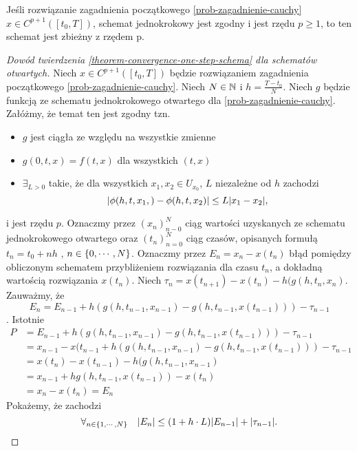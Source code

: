 \documentclass[12pt,a4paper]{report}
\begin{document}
\begin{theorem} \label{theorem-convergence-one-step-schema} 
Jeśli rozwiązanie zagadnienia początkowego \ref{prob-zagadnienie-cauchy} $x \in C^{p+1}([t_0,T])$, schemat jednokrokowy jest zgodny i jest rzędu $p\geqslant1$, to ten schemat jest zbieżny z rzędem p. 

\end{theorem}
\begin{proof}[Dowód twierdzenia \ref{theorem-convergence-one-step-schema} dla schematów otwartych]

Niech $ x \in C^{p+1}([t_0,T]) $ będzie rozwiązaniem zagadnienia początkowego  \ref{prob-zagadnienie-cauchy}. Niech $ N \in \mathbb{N} $ i $ h = \frac{T-t_0}{N} $. Niech $g$ będzie funkcją ze schematu jednokrokowego otwartego dla \ref{prob-zagadnienie-cauchy}. Załóżmy, że temat ten jest zgodny tzn. 
\begin{itemize}
\item $g$ jest ciągła ze względu na wszystkie zmienne 
\item $ g(0,t,x) = f(t,x)$ dla wszystkich $ (t,x) $
\item $ \exists_{L>0} $ takie, że dla wszystkich $x_1 , x_2 \in U_{x_{0}} $, $L$ niezależne od $h$ zachodzi
$$
{\left| {\phi(h,t,x_1,) - \phi(h,t,x_2)} \right|} \leq L  {\left| {x_1 - x_2} \right|} ,
$$
\end{itemize}
i jest rzędu $p$. 
Oznaczmy przez $ (x_n)_{n-0}^{N} $ ciąg wartości uzyskanych ze schematu jednokrokowego otwartego oraz $(t_n)_{n=0}^{N}$ ciąg czasów, opisanych formułą $ t_n = t_0 + nh $ , $ n \in \left\lbrace {0, \cdots, N} \right\rbrace $. Oznaczmy przez $E_n = x_n - x(t_n)$ błąd pomiędzy obliczonym schematem przybliżeniem rozwiązania dla czasu $t_n$, a dokładną wartością rozwiązania $x(t_n)$. Niech $\tau_n = x(t_{n+1}) - x(t_n) - h(g(h,t_n,x_n) $. Zauważmy, że 
$$
E_n = E_{n-1} + h(g(h,t_{n-1},x_{n-1}) - g(h,t_{n-1},x(t_{n-1}))) - \tau_{n-1} 
$$. 
Istotnie
\begin{equation}
\begin{array}{rl}
P &= E_{n-1} + h(g(h,t_{n-1},x_{n-1}) - g(h,t_{n-1},x(t_{n-1}))) - \tau_{n-1} \\
 &= x_{n-1} - x(t_{n-1} + h(g(h,t_{n-1},x_{n-1}) - g(h,t_{n-1},x(t_{n-1}))) - \tau_{n-1} \\
 &= x(t_{n}) - x(t_{n-1}) - h(g(h,t_{n-1},x_{n-1}) \\
 &= x_{n-1} + hg(h,t_{n-1},x(t_{n-1})) - x(t_n) \\
 &= x_n - x(t_n) = E_n 
\end{array}
\end{equation} 
Pokażemy, że zachodzi 
\begin{equation} \label{proof1}
\forall_{n \in \left\lbrace {1,\cdots,N} \right\rbrace} \quad  {\left| {E_n} \right|} \leq (1 + h \cdot L) {\left| {E_{n-1}} \right|} + {\left| {\tau_{n-1}} \right|} .
\end{equation}
 

\end{proof}
\end{document}
